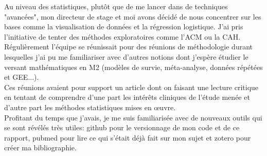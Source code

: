 \documentclass{book}
\begin{document}
\noindent
Au niveau des statistiques, plutôt que de me lancer dans de techniques "avancées", mon directeur de stage et moi avons décidé de nous concentrer sur les bases comme la visualisation de données et la régression logistique. J'ai pris l'initiative de tenter des méthodes exploratoires comme l'ACM ou la CAH.\\
Régulièrement l'équipe se réunissait pour des réunions de méthodologie durant lesquelles j'ai pu me familiariser avec d'autres notions dont j'espère étudier le versant mathématiques en M2 (modèles de survie, méta-analyse, données répétées et GEE...).\\
Ces réunions avaient pour support un article dont on faisant une lecture critique en tentant de comprendre d'une part les intérêts cliniques de l'étude menée et d'autre part les méthodes statistiques mises en œuvre.\\

\noindent
Profitant du temps que j'avais, je me suis familiarisée avec de nouveaux outils qui se sont révélés très utiles: github pour le versionnage de mon code et de ce rapport, pubmed pour lire ce qui s'était déjà fait sur mon sujet et zotero pour créer ma bibliographie.
\end{document}
